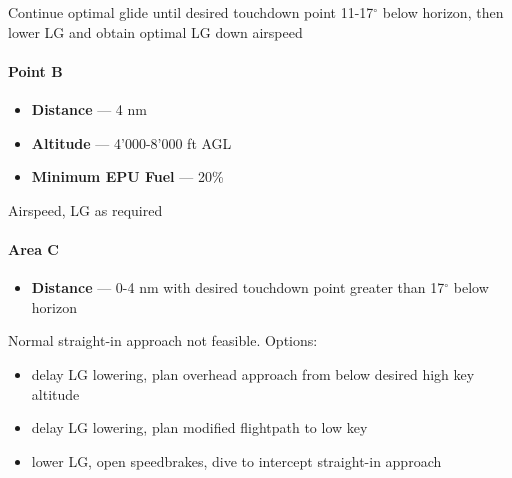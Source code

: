 Continue optimal glide until desired touchdown point
11-17$^\circ$ below horizon, 
then lower LG and obtain optimal LG down airspeed

\paragraph{Point B}
\begin{itemize}
    \item \textbf{Distance} --- 4 nm 
    \item \textbf{Altitude} --- 4'000-8'000 ft AGL
    \item \textbf{Minimum EPU Fuel} --- 20\%
\end{itemize}

Airspeed, LG as required

\paragraph{Area C}
\begin{itemize}
    \item \textbf{Distance} --- 0-4 nm with desired touchdown point greater than 17$^\circ$ below horizon
\end{itemize}

Normal straight-in approach not feasible. Options:
\begin{itemize}
    \item delay LG lowering, plan overhead approach from below desired high key altitude
    \item delay LG lowering, plan modified flightpath to low key
    \item lower LG, open speedbrakes, dive to intercept straight-in approach
\end{itemize}

